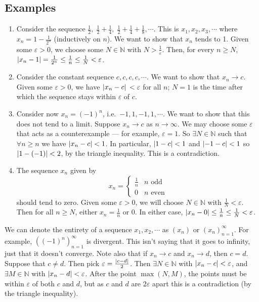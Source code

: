 \subsection{Examples}
\begin{enumerate}
	\item Consider the sequence \(\frac{1}{2},\; \frac{1}{2} + \frac{1}{4},\; \frac{1}{2} + \frac{1}{4} + \frac{1}{8}, \cdots\). This is \(x_1, x_2, x_3, \cdots\) where \(x_n = 1 - \frac{1}{2^n}\) (inductively on \(n\)). We want to show that \(x_n\) tends to 1. Given some \(\varepsilon > 0\), we choose some \(N \in \mathbb N\) with \(N > \frac{1}{\varepsilon}\). Then, for every \(n \geq N\), \(\abs{x_n - 1} = \frac{1}{2^n} \leq \frac{1}{n} \leq \frac{1}{N} < \varepsilon\).
	\item Consider the constant sequence \(c, c, c, c, \cdots\). We want to show that \(x_n \to c\). Given some \(\varepsilon > 0\), we have \(\abs*{x_n - c} < \varepsilon\) for all \(n\); \(N=1\) is the time after which the sequence stays within \(\varepsilon\) of \(c\).
	\item Consider now \(x_n = (-1)^n\), i.e.\ \(-1, 1, -1, 1, \cdots\). We want to show that this does not tend to a limit. Suppose \(x_n \to c\) as \(n \to \infty\). We may choose some \(\varepsilon\) that acts as a counterexample --- for example, \(\varepsilon = 1\). So \(\exists N \in \mathbb N\) such that \(\forall n \geq n\) we have \(\abs{x_n - c} < 1\). In particular, \(\abs{1 - c} < 1\) and \(\abs{-1 - c} < 1\) so \(\abs{1 - (-1)} < 2\), by the triangle inequality. This is a contradiction.
	\item The sequence \(x_n\) given by
	      \[
		      x_n = \begin{cases}
			      \frac{1}{n} & n \text{ odd}  \\
			      0           & n \text{ even}
		      \end{cases}
	      \]
	      should tend to zero. Given some \(\varepsilon > 0\), we will choose \(N \in \mathbb N\) with \(\frac{1}{N} < \varepsilon\). Then for all \(n \geq N\), either \(x_n = \frac{1}{n}\) or 0. In either case, \(\abs{x_n - 0} \leq \frac{1}{n} \leq \frac{1}{N} < \varepsilon\).
\end{enumerate}
We can denote the entirety of a sequence \(x_1, x_2, \cdots\) as \((x_n)\) or \((x_n)_{n=1}^\infty\). For example, \(\left( (-1)^n \right)_{n=1}^{\infty}\) is divergent. This isn't saying that it goes to infinity, just that it doesn't converge. Note also that if \(x_n \to c\) and \(x_n \to d\), then \(c=d\). Suppose that \(c \neq d\). Then pick \(\varepsilon = \frac{\abs{c-d}}{2}\). Then \(\exists N \in \mathbb N\) with \(\abs{x_n - c} < \varepsilon\), and \(\exists M \in \mathbb N\) with \(\abs{x_n - d} < \varepsilon\). After the point \(\max(N, M)\), the points must be within \(\varepsilon\) of both \(c\) and \(d\), but as \(c\) and \(d\) are \(2\varepsilon\) apart this is a contradiction (by the triangle inequality).

